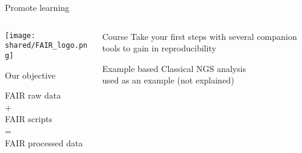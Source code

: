 \begin{frame}{Promote learning}  
  \begin{columns}
    \begin{column}{.3\textwidth}
     \texttt{[image: shared/FAIR\_logo.png]}
     \begin{block}{Our objective}
       \begin{center}
       FAIR raw data\\
       +\\
       FAIR scripts\\
       =\\
       FAIR processed data
       \end{center}
     \end{block}
    \end{column}
    \begin{column}{.55\textwidth}
    \begin{block}{Course}
    Take your first steps with several companion tools to gain in reproducibility
    \end{block}
     \begin{block}{Example based}
       Classical NGS analysis\\used as an example (not explained)
     \end{block}
    \end{column}
  \end{columns}
\end{frame}